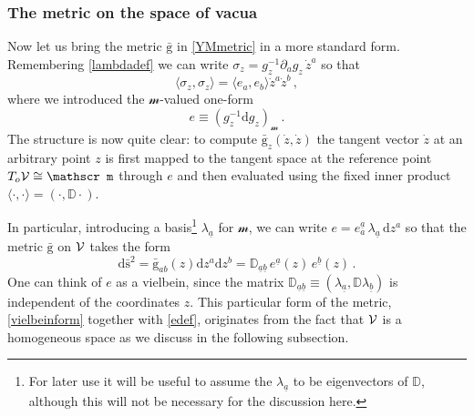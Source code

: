 \documentclass[11pt,a4paper]{article}
\def\calsm{{\boldsymbol{\mathscr m}}}
\def\calv{{\cal V}}
\def\ua{{\underline{a}}}
\def\ub{{\underline{b}}}
\def\rg{{\mathrm{g}}}
\def\rd{{\mathrm{d}}}
\def\Dperp{{\mathbb{D}}}
\begin{document}
	\subsubsection{The metric on the space of vacua}
	Now let us bring the metric  $\bar \rg$ in \eqref{YMmetric} in a more standard form. Remembering \eqref{lambdadef} we can write $\sigma_z=g_z^{-1}\partial_a g_z\,\dot z^a$ so that
	\begin{equation}
	\langle\sigma_z,\sigma_z\rangle=\langle e_a,e_b\rangle \dot z^a\dot z^b\,,
	\end{equation}
	where we introduced the $\calsm$-valued one-form 
	\begin{equation}
	e\equiv\left(g_z^{-1}\rd g_z\right)_\calsm\,.\label{edef}
	\end{equation}  
    The structure is now quite clear: to compute  $\bar{\rg}_z(\dot z,\dot z)$ the tangent vector $\dot z$ at an arbitrary point $z$ is first mapped to the tangent space at the reference point $T_o\calv\cong \calsm$ through $e$ and then evaluated using the fixed inner product $\langle\cdot,\cdot\rangle=(\cdot,\Dperp\cdot)$.
	
	In particular, introducing a basis\footnote{For later use it will be useful to assume the $\lambda_\ua$ to be eigenvectors of $\Dperp$, although this will not be necessary for the discussion here.} $\lambda_\ua$ for $\calsm$, we can write $e=e^\ua_a\,\lambda_\ua\,\rd z^a$ so that the metric $\bar{\rg}$ on $\calv$ takes the form
	\begin{equation}
	\boxed{\rd \bar{\mathrm{s}}^2=\bar\rg_{ab}(z)\rd z^a\rd z^b=\Dperp_{\ua\ub}\,e^\ua(z)\,e^\ub(z)\,.\label{vielbeinform}}
	\end{equation}
 	One can think of $e$ as a vielbein, since the matrix $\Dperp_{\ua\ub}\equiv(\lambda_\ua,\Dperp\lambda_\ub)$ is independent of the coordinates $z$. This particular form of the metric, \eqref{vielbeinform} together with \eqref{edef}, originates from the fact that $\calv$ is a homogeneous space as we  discuss in the following subsection.

   
\end{document}
